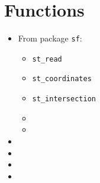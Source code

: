 \section{Functions}\label{Sec:Functions}

\begin{itemize}

    \item From package \texttt{sf}:
    		\begin{itemize}

    		\item \texttt{st\_read}

    		\item \texttt{st\_coordinates}

    		\item \texttt{st\_intersection}

   		\item 

   		\item 

\end{itemize}

    \item 

    \item 

    \item 

    \item 

\end{itemize}
